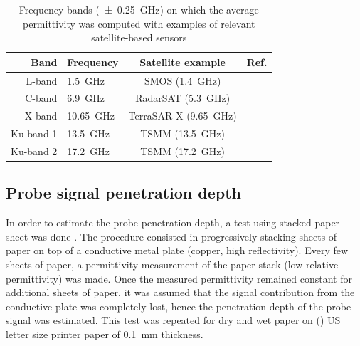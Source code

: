 \begin{table}[ht!]
    \centering
    \caption{Frequency bands (\qty{\pm0.25}{\giga\hertz}) on which the average permittivity was computed with examples of relevant satellite-based sensors}\label{tab:freq-range}
    \begin{tabular}{r l c c}
        Band & Frequency & Satellite example & Ref. \\
        \midrule\midrule
        L-band & \qty{1.5}{\giga\hertz} & SMOS (\qty{1.4}{\giga\hertz}) & \parencite{Kerr2010}\\
        C-band & \qty{6.9}{\giga\hertz} & RadarSAT (\qty{5.3}{\giga\hertz}) & \parencite{Morena2004} \\
        X-band & \qty{10.65}{\giga\hertz} & TerraSAR-X (\qty{9.65}{\giga\hertz}) & \parencite{Werninghaus2010} \\
        Ku-band 1 & \qty{13.5}{\giga\hertz} & TSMM (\qty{13.5}{\giga\hertz}) & \parencite{Derksen2019,Garnaud2019} \\
        Ku-band 2 & \qty{17.2}{\giga\hertz} & TSMM (\qty{17.2}{\giga\hertz}) & \\
    \end{tabular}
\end{table}

\subsection{Probe signal penetration depth}\label{subsec:metho-paper}
In order to estimate the probe penetration depth, a test using stacked paper sheet was done \parencite{Elrayes1987}.
The procedure consisted in progressively stacking sheets of paper on top of a conductive metal plate (copper, high reflectivity).
Every few sheets of paper, a permittivity measurement of the paper stack (low relative permittivity) was made.
Once the measured permittivity remained constant for additional sheets of paper, it was assumed that the signal contribution from the conductive plate was completely lost, hence the penetration depth of the probe signal was estimated.
This test was repeated for dry and wet paper on  () US letter size printer paper of \qty{0.1}{\milli\metre} thickness. %

